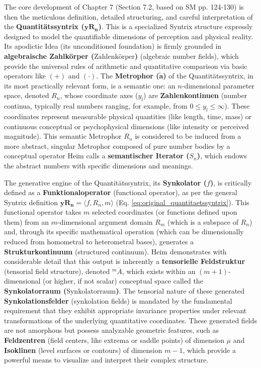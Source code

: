 \documentclass[12pt]{article}
\newcommand{\metrophor}{\bm{\widetilde{a}}}
\newcommand{\quantitaetssyntrix}{\bm{yR_n}}
\newcommand{\zahlenkoerper}{\text{Zahlenkörper}}
\newcommand{\synkolatorraum}{\text{Synkolatorraum}}
\begin{document}
The core development of Chapter 7 (Section 7.2, based on SM pp. 124-130) is then the meticulous definition, detailed structuring, and careful interpretation of the \textbf{Quantitätssyntrix (\(\quantitaetssyntrix\))}. This is a specialized Syntrix structure expressly designed to model the quantifiable dimensions of perception and physical reality. Its apodictic Idea (its unconditioned foundation) is firmly grounded in \textbf{algebraische Zahlkörper (\(\zahlenkoerper\))} (algebraic number fields), which provide the universal rules of arithmetic and quantitative comparison via basic operators like $(+)$ and $(\cdot)$. The \textbf{Metrophor (\(\metrophor\))} of the Quantitätssyntrix, in its most practically relevant form, is a semantic one: an \( n \)-dimensional parameter space, denoted \( R_n \), whose coordinate axes (\( y_l \)) are \textbf{Zahlenkontinuen} (number continua, typically real numbers ranging, for example, from \( 0 \leq y_l \leq \infty \)). These coordinates represent measurable physical quantities (like length, time, mass) or continuous conceptual or psychophysical dimensions (like intensity or perceived magnitude). This semantic Metrophor \( R_n \) is considered to be induced from a more abstract, singular Metrophor composed of pure number bodies by a conceptual operator Heim calls a \textbf{semantischer Iterator (\( S_n \))}, which endows the abstract numbers with specific dimensions and meanings.

The generative engine of the Quantitätssyntrix, its \textbf{Synkolator (\( f \))}, is critically defined as a \textbf{Funktionaloperator} (functional operator), as per the general Syntrix definition \( \quantitaetssyntrix = \langle f, R_n, m \rangle \) (Eq. \eqref{eq:original_quantitaetssyntrix}). This functional operator takes \( m \) selected coordinates (or functions defined upon them) from an \( m \)-dimensional argument domain \( R_m \) (which is a subspace of \( R_n \)) and, through its specific mathematical operation (which can be dimensionally reduced from homometral to heterometral bases), generates a \textbf{Strukturkontinuum} (structured continuum). Heim demonstrates with considerable detail that this output is inherently a \textbf{tensorielle Feldstruktur} (tensorial field structure), denoted \( ^m\overline{A} \), which exists within an \( (m+1) \)-dimensional (or higher, if not scalar) conceptual space called the \textbf{Synkolatorraum (\(\synkolatorraum\))}. The tensorial nature of these generated \textbf{Synkolationsfelder} (synkolation fields) is mandated by the fundamental requirement that they exhibit appropriate invariance properties under relevant transformations of the underlying quantitative coordinates. These generated fields are not amorphous but possess analyzable geometric features, such as \textbf{Feldzentren} (field centers, like extrema or saddle points) of dimension $\mu$ and \textbf{Isoklinen} (level surfaces or contours) of dimension $m-1$, which provide a powerful means to visualize and interpret their complex structure.
\end{document}
